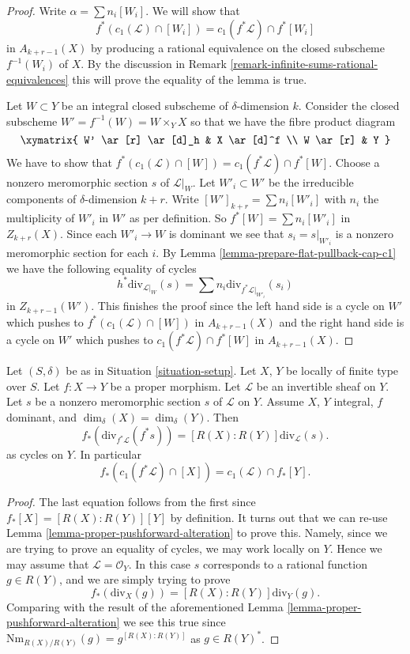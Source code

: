 \begin{proof}
Write $\alpha = \sum n_i[W_i]$. We will show that
$$
f^*(c_1(\mathcal{L}) \cap [W_i]) = c_1(f^*\mathcal{L}) \cap f^*[W_i]
$$
in $A_{k + r - 1}(X)$ by producing a rational equivalence
on the closed subscheme $f^{-1}(W_i)$ of $X$.
By the discussion in
Remark \ref{remark-infinite-sums-rational-equivalences}
this will prove the equality of the lemma is true.

\medskip\noindent
Let $W \subset Y$ be an integral closed subscheme of $\delta$-dimension $k$.
Consider the closed subscheme $W' = f^{-1}(W) = W \times_Y X$
so that we have the fibre product diagram
$$
\xymatrix{
W' \ar[r] \ar[d]_h & X \ar[d]^f \\
W \ar[r] & Y
}
$$
We have to show that
$f^*(c_1(\mathcal{L}) \cap [W]) = c_1(f^*\mathcal{L}) \cap f^*[W]$.
Choose a nonzero meromorphic section $s$ of $\mathcal{L}|_W$.
Let $W'_i \subset W'$ be the irreducible components of
$\delta$-dimension $k + r$. Write $[W']_{k + r} = \sum n_i[W'_i]$
with $n_i$ the multiplicity of $W'_i$ in $W'$ as per definition.
So $f^*[W] = \sum n_i[W'_i]$ in $Z_{k + r}(X)$.
Since each $W'_i \to W$ is dominant we
see that $s_i = s|_{W'_i}$ is a nonzero meromorphic section for
each $i$. By Lemma \ref{lemma-prepare-flat-pullback-cap-c1}
we have the following equality of cycles
$$
h^*\text{div}_{\mathcal{L}|_W}(s) =
\sum n_i\text{div}_{f^*\mathcal{L}|_{W'_i}}(s_i)
$$
in $Z_{k + r - 1}(W')$. This finishes the proof since
the left hand side is a cycle on $W'$ which pushes to
$f^*(c_1(\mathcal{L}) \cap [W])$ in $A_{k + r - 1}(X)$
and the right hand side is a cycle on $W'$ which pushes to
$c_1(f^*\mathcal{L}) \cap f^*[W]$ in $A_{k + r - 1}(X)$.
\end{proof}

\begin{lemma}
\label{lemma-equal-c1-as-cycles}
Let $(S, \delta)$ be as in Situation \ref{situation-setup}.
Let $X$, $Y$ be locally of finite type over $S$.
Let $f : X \to Y$ be a proper morphism.
Let $\mathcal{L}$ be an invertible sheaf on $Y$.
Let $s$ be a nonzero meromorphic section $s$ of $\mathcal{L}$ on $Y$.
Assume $X$, $Y$ integral, $f$ dominant, and $\dim_\delta(X) = \dim_\delta(Y)$.
Then
$$
f_*\left(\text{div}_{f^*\mathcal{L}}(f^*s)\right) =
[R(X) : R(Y)]\text{div}_\mathcal{L}(s).
$$
as cycles on $Y$. In particular
$$
f_*(c_1(f^*\mathcal{L}) \cap [X]) = c_1(\mathcal{L}) \cap f_*[Y].
$$
\end{lemma}

\begin{proof}
The last equation follows from the first since $f_*[X] = [R(X) : R(Y)][Y]$
by definition. It turns out that we can re-use
Lemma \ref{lemma-proper-pushforward-alteration}
to prove this. Namely, since we are trying to prove an equality
of cycles, we may work locally on $Y$. Hence we may assume
that $\mathcal{L} = \mathcal{O}_Y$. In this case $s$
corresponds to a rational function $g \in R(Y)$, and
we are simply trying to prove
$$
f_*\left(\text{div}_X(g)\right) =
[R(X) : R(Y)]\text{div}_Y(g).
$$
Comparing with the result of the aforementioned
Lemma \ref{lemma-proper-pushforward-alteration}
we see this true since
$\text{Nm}_{R(X)/R(Y)}(g) = g^{[R(X) : R(Y)]}$
as $g \in R(Y)^*$.
\end{proof}

